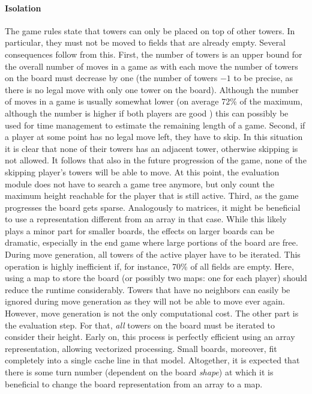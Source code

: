 \documentclass[sigconf]{acmart}
\begin{document}
\paragraph{Isolation}
The game rules state that towers can only be placed on top of other towers.
In particular, they must not be moved to fields that are already empty.
Several consequences follow from this.
First, the number of towers is an upper bound for the overall number of moves in a game as with each move the number of towers on the board must decrease by one (the number of towers $-1$ to be precise, as there is no legal move with only one tower on the board).
Although the number of moves in a game is usually somewhat lower (on average 72\% of the maximum, although the number is higher if both players are good \cite{Althöfer2020}) this can possibly be used for time management to estimate the remaining length of a game.
Second, if a player at some point has no legal move left, they have to skip.
In this situation it is clear that none of their towers has an adjacent tower, otherwise skipping is not allowed.
It follows that also in the future progression of the game, none of the skipping player's towers will be able to move.
At this point, the evaluation module does not have to search a game tree anymore, but only count the maximum height reachable for the player that is still active.
Third, as the game progresses the board gets sparse.
Analogously to matrices, it might be beneficial to use a representation different from an array in that case.
While this likely plays a minor part for smaller boards, the effects on larger boards can be dramatic, especially in the end game where large portions of the board are free.
During move generation, all towers of the active player have to be iterated.
This operation is highly inefficient if, for instance, 70\% of all fields are empty.
Here, using a map to store the board (or possibly two maps: one for each player) should reduce the runtime considerably.
Towers that have no neighbors can easily be ignored during move generation as they will not be able to move ever again.
However, move generation is not the only computational cost.
The other part is the evaluation step.
For that, \emph{all} towers on the board must be iterated to consider their height.
Early on, this process is perfectly efficient using an array representation, allowing vectorized processing.
Small boards, moreover, fit completely into a single cache line in that model.
Altogether, it is expected that there is some turn number (dependent on the board \emph{shape}) at which it is beneficial to change the board representation from an array to a map.
\end{document}
